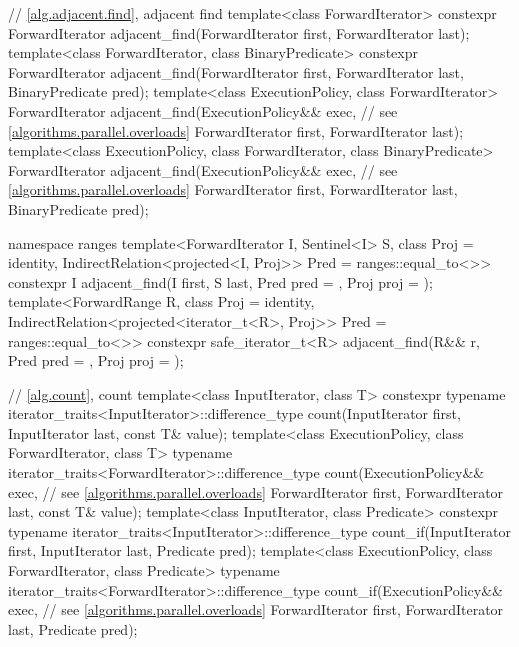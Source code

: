\begin{codeblock}
{  // \ref{alg.adjacent.find}, adjacent find
  template<class ForwardIterator>
    constexpr ForwardIterator
      adjacent_find(ForwardIterator first, ForwardIterator last);
  template<class ForwardIterator, class BinaryPredicate>
    constexpr ForwardIterator
      adjacent_find(ForwardIterator first, ForwardIterator last,
                    BinaryPredicate pred);
  template<class ExecutionPolicy, class ForwardIterator>
    ForwardIterator
      adjacent_find(ExecutionPolicy&& exec, // see \ref{algorithms.parallel.overloads}
                    ForwardIterator first, ForwardIterator last);
  template<class ExecutionPolicy, class ForwardIterator, class BinaryPredicate>
    ForwardIterator
      adjacent_find(ExecutionPolicy&& exec, // see \ref{algorithms.parallel.overloads}
                    ForwardIterator first, ForwardIterator last,
                    BinaryPredicate pred);

  namespace ranges {
    template<ForwardIterator I, Sentinel<I> S, class Proj = identity,
             IndirectRelation<projected<I, Proj>> Pred = ranges::equal_to<>>
      constexpr I adjacent_find(I first, S last, Pred pred = {},
                                Proj proj = {});
    template<ForwardRange R, class Proj = identity,
             IndirectRelation<projected<iterator_t<R>, Proj>> Pred = ranges::equal_to<>>
      constexpr safe_iterator_t<R>
        adjacent_find(R&& r, Pred pred = {}, Proj proj = {});
  }

  // \ref{alg.count}, count
  template<class InputIterator, class T>
    constexpr typename iterator_traits<InputIterator>::difference_type
      count(InputIterator first, InputIterator last, const T& value);
  template<class ExecutionPolicy, class ForwardIterator, class T>
    typename iterator_traits<ForwardIterator>::difference_type
      count(ExecutionPolicy&& exec, // see \ref{algorithms.parallel.overloads}
            ForwardIterator first, ForwardIterator last, const T& value);
  template<class InputIterator, class Predicate>
    constexpr typename iterator_traits<InputIterator>::difference_type
      count_if(InputIterator first, InputIterator last, Predicate pred);
  template<class ExecutionPolicy, class ForwardIterator, class Predicate>
    typename iterator_traits<ForwardIterator>::difference_type
      count_if(ExecutionPolicy&& exec, // see \ref{algorithms.parallel.overloads}
               ForwardIterator first, ForwardIterator last, Predicate pred);

}
\end{codeblock}
